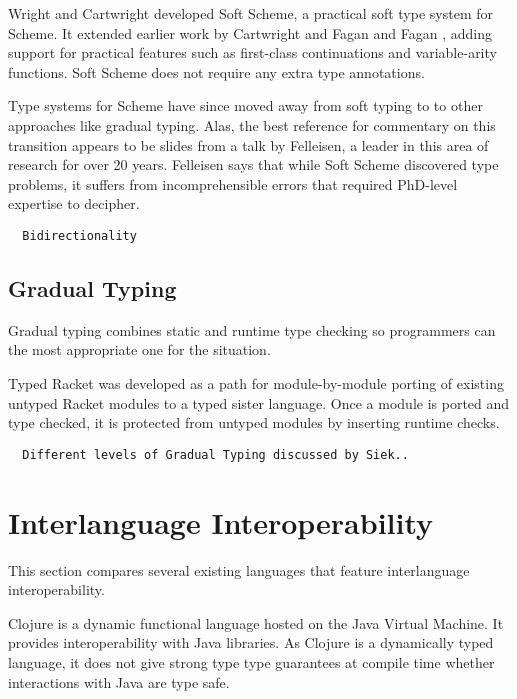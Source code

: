 Wright and Cartwright\cite{WC97} developed Soft Scheme, a practical
soft type system for Scheme. 
It extended earlier work by Cartwright and Fagan\cite{CF91}
and Fagan \cite{Fag91}, adding support for practical features such as
first-class continuations and variable-arity functions.
Soft Scheme does not require any extra type annotations.

Type systems for Scheme have since moved away from soft typing
to to other approaches like gradual typing.
Alas, the best reference for commentary on this transition 
appears to be slides from a talk by Felleisen\cite{Fell09},
a leader in this area of research for over 20 years.
Felleisen says that while Soft Scheme discovered type problems, 
it suffers from incomprehensible
errors that required PhD-level expertise to decipher. 

\begin{verbatim}
  Bidirectionality
\end{verbatim}

\subsection{Gradual Typing}

Gradual typing combines static and runtime type checking so programmers
can the most appropriate one for the situation.

Typed Racket was developed as a path for module-by-module
porting of existing untyped Racket modules to a typed sister language\cite{Tob10}.
Once a module is ported and type checked, it is protected from untyped modules
by inserting runtime checks.

\begin{verbatim}
  Different levels of Gradual Typing discussed by Siek..
\end{verbatim}

\section{Interlanguage Interoperability}

This section compares several existing languages that feature interlanguage interoperability.

Clojure is a dynamic functional language hosted on the Java Virtual Machine. It provides 
interoperability with Java libraries. As Clojure is a dynamically typed language, it does
not give strong type type guarantees at compile time whether interactions with Java
are type safe.

